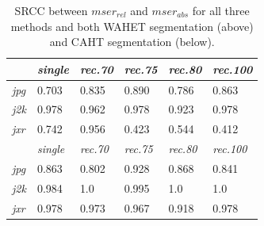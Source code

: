 \documentclass[10pt,twocolumn,letterpaper]{article}
\begin{document}
\begin{table}\footnotesize\centering
\begin{tabular}{ | l || l | l | l | l | l | }
    \hline
    & \emph{single} & \emph{rec.70} & \emph{rec.75} & \emph{rec.80} & \emph{rec.100} \\ \hline
    \emph{jpg} & 0.703 \cellcolor[rgb]{0,0.8,0} & 0.835 \cellcolor[rgb]{0,0.65,0} & 0.890 \cellcolor[rgb]{0,0.65,0} & 0.786 \cellcolor[rgb]{0,0.8,0} & 0.863 \cellcolor[rgb]{0,0.65,0} \\ \hline
    \emph{j2k} & 0.978 \cellcolor[rgb]{0,0.65,0} & 0.962 \cellcolor[rgb]{0,0.65,0} & 0.978 \cellcolor[rgb]{0,0.65,0} & 0.923 \cellcolor[rgb]{0,0.65,0} & 0.978 \cellcolor[rgb]{0,0.65,0} \\ \hline
    \emph{jxr} & 0.742 \cellcolor[rgb]{0,0.8,0} & 0.956 \cellcolor[rgb]{0,0.65,0} & 0.423 \cellcolor{orange} & 0.544 \cellcolor[rgb]{0,0.8,0} & 0.412 \cellcolor{orange} \\ \hline
    
    \hline
    & \emph{single} & \emph{rec.70} & \emph{rec.75} & \emph{rec.80} & \emph{rec.100} \\ \hline
    \emph{jpg} & \cellcolor[rgb]{0,0.65,0} 0.863 & \cellcolor[rgb]{0,0.65,0} 0.802 & \cellcolor[rgb]{0,0.65,0} 0.928 & \cellcolor[rgb]{0,0.65,0} 0.868 & \cellcolor[rgb]{0,0.65,0} 0.841 \\ \hline
    \emph{j2k} & \cellcolor[rgb]{0,0.65,0} 0.984 & \cellcolor[rgb]{0,0.65,0} 1.0 & \cellcolor[rgb]{0,0.65,0} 0.995 & \cellcolor[rgb]{0,0.65,0} 1.0 & \cellcolor[rgb]{0,0.65,0} 1.0 \\ \hline
    \emph{jxr} & \cellcolor[rgb]{0,0.65,0} 0.978 & \cellcolor[rgb]{0,0.65,0} 0.973 & \cellcolor[rgb]{0,0.65,0} 0.967 & \cellcolor[rgb]{0,0.65,0} 0.918 & \cellcolor[rgb]{0,0.65,0} 0.978 \\ \hline

\end{tabular}
\vspace{1mm}
\caption{SRCC between $mser_{rel}$ and $mser_{abs}$ for all three methods and both WAHET segmentation (above) and CAHT segmentation (below).}
\label{tab:corrMSER}
\end{table}
\end{document}
